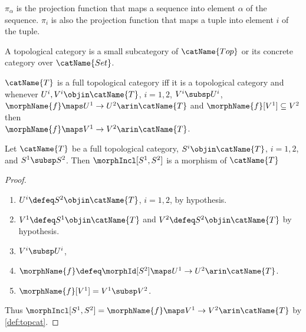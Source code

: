 \documentclass{article}
\begin{document}
\begin{definition}[Projections]
\label{projections}
$\pi_\alpha$ is the projection function that maps a sequence into
element $\alpha$ of the sequence.  $\pi_i$ is also the projection
function that maps a tuple into element $i$ of the tuple.
\end{definition}

\begin{definition}
\label{def:topcat}
A topological category is a small subcategory of $\catName{Top}$ or its
concrete category over $\catName{Set}$.

$\catName{T}$ is a full topological category iff it is a topological
category and whenever $U^i,V^i \objin \catName{T}$, $i=1,2$,
$V^i \subsp U^i$,
$\morphName{f} \maps U^1 \to U^2 \arin \catName{T}$ and
$\morphName{f}[V^1] \subseteq V^2$ then \\
$\morphName{f} \maps V^1 \to V^2 \arin \catName{T}$.
\end{definition}

\begin{lemma}
\label{lem:topInc}
Let $\catName{T}$ be a full topological category,
$S^i \objin \catName{T}$, $i=1,2$, and $S^1 \subsp S^2$. Then
$\morphIncl[S^1,S^2]$ is a morphism of $\catName{T}$

\begin{proof}
\begin{enumerate}
\item
$U^i \defeq S^2 \objin \catName{T}$, $i=1,2$, by hypothesis.

\item
$V^1 \defeq S^1 \objin \catName{T}$ and
$V^2 \defeq S^2 \objin \catName{T}$ by hypothesis.

\item
$V^i \subsp U^i$,

\item
$\morphName{f} \defeq \morphId[S^2] \maps U^1 \to U^2 \arin \catName{T}$.

\item
$\morphName{f}[V^1] = V^1 \subsp V^2$.
\end{enumerate}

Thus $\morphIncl[S^1,S^2] = \morphName{f} \maps V^1 \to V^2 \arin \catName{T}$
by \cref{def:topcat}.
\end{proof}
\end{lemma}
\end{document}
